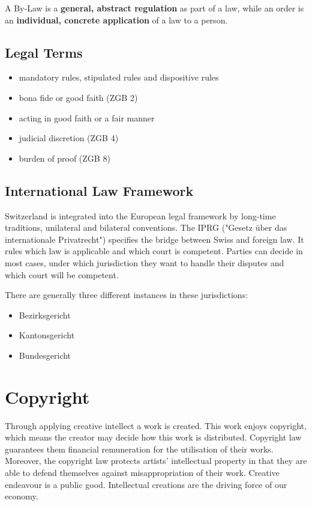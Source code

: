 \documentclass[11pt]{article}
\theoremstyle{definition}
\begin{document}
A By-Law is a \textbf{general, abstract regulation} as part of a law, while an order is an \textbf{individual, concrete application} of a law to a person.

\subsection{Legal Terms}
\begin{itemize}
	\item mandatory rules, stipulated rules and dispositive rules
	\item bona fide or good faith (ZGB 2)
	\item acting in good faith or a fair manner
	\item judicial discretion (ZGB 4)
	\item burden of proof (ZGB 8)
\end{itemize}

\subsection{International Law Framework}
Switzerland is integrated into the European legal framework by long-time traditions, unilateral and bilateral conventions. The IPRG ("Gesetz über das internationale Privatrecht") specifies the bridge between Swiss and foreign law. It rules which law is applicable and which court is competent. Parties can decide in most cases, under which jurisdiction they want to handle their disputes and which court will be competent.

There are generally three different instances in these jurisdictions:
\begin{itemize}
	\item Bezirksgericht
	\item Kantonsgericht
	\item Bundesgericht
\end{itemize}

\section{Copyright}
Through applying creative intellect a work is created. This work enjoys copyright, which means the creator may decide how this work is distributed. Copyright law guarantees them financial remuneration for the utilisation of their works. Moreover, the copyright law protects artists’ intellectual property in that they are able to defend themselves against
misappropriation of their work. Creative endeavour is a public good. Intellectual creations are the driving force of our economy.
\end{document}
